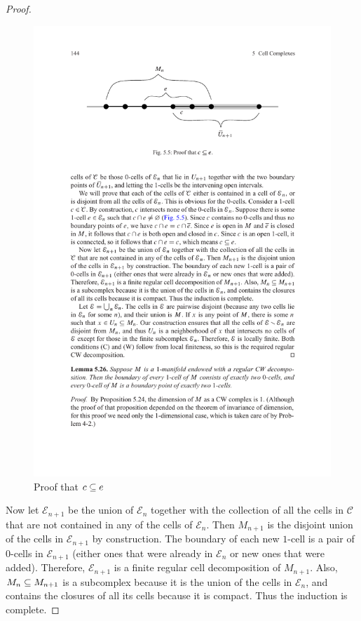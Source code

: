 \begin{proof}
\begin{figure}
\centering
\includegraphics{1-maniCW.pdf}
\caption{Proof that $c\subseteq e$}
\end{figure}
Now let $\mathcal{E}_{n+1}$ be the union of $\mathcal{E}_n$ together with the collection of all the cells in $\mathcal{C}$ that are not contained in any of the cells of $\mathcal{E}_n$. Then $M_{n+1}$ is the disjoint union of the cells in $\mathcal{E}_{n+1}$ by construction. The boundary of each new $1$-cell is a pair of $0$-cells in $\mathcal{E}_{n+1}$ (either ones that were already in $\mathcal{E}_n$ or new ones that were added). Therefore, $\mathcal{E}_{n+1}$ is a finite regular cell decomposition of $M_{n+1}$. Also, $M_n\subseteq M_{n+1}$ is a subcomplex because it is the union of the cells in $\mathcal{E}_n$, and contains the closures of all its cells because it is compact. Thus the induction is complete.\par

\end{proof}
